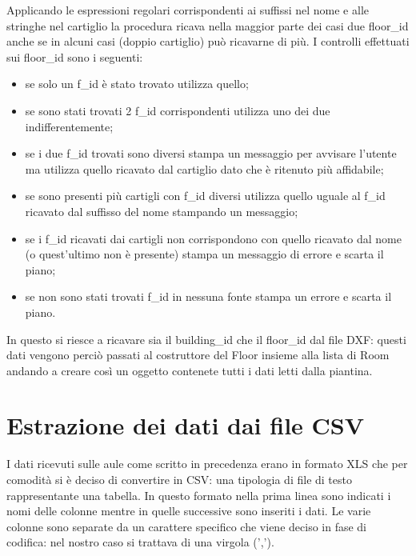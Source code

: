 \documentclass[12pt]{report}
\begin{document}
\vspace{5mm} %

Applicando le espressioni regolari corrispondenti ai suffissi nel nome e alle stringhe nel cartiglio la procedura ricava nella maggior parte dei casi due floor\_id anche se in alcuni casi (doppio cartiglio) può ricavarne di più. 
I controlli effettuati sui floor\_id sono i seguenti:
\begin{itemize}
\item se solo un f\_id è stato trovato utilizza quello;
\item se sono stati trovati 2 f\_id corrispondenti utilizza uno dei due indifferentemente;
\item se i due f\_id trovati sono diversi stampa un messaggio per avvisare l'utente ma utilizza quello ricavato dal cartiglio dato che è ritenuto più affidabile;
\item se sono presenti più cartigli con f\_id diversi utilizza quello uguale al f\_id ricavato dal suffisso del nome stampando un messaggio;
\item se i f\_id ricavati dai cartigli non corrispondono con quello ricavato dal nome (o quest'ultimo non  è presente) stampa un messaggio di errore e scarta il piano;
\item se non sono stati trovati f\_id in nessuna fonte stampa un errore e scarta il piano.  
\end{itemize}

In questo si riesce a ricavare sia il building\_id che il floor\_id dal file DXF: questi dati vengono perciò passati al costruttore del Floor insieme alla lista di Room andando a creare così un oggetto contenete tutti i dati letti dalla piantina.

\newpage
\section{Estrazione dei dati dai file CSV}

I dati ricevuti sulle aule come scritto in precedenza erano in formato XLS che per comodità si è deciso di convertire in CSV: una tipologia di file di testo rappresentante una tabella.
In questo formato nella prima linea sono indicati i nomi delle colonne mentre in quelle successive sono inseriti i dati. Le varie colonne sono separate da un carattere specifico che viene deciso in fase di codifica: nel nostro caso si trattava di una virgola (',').
\end{document}
